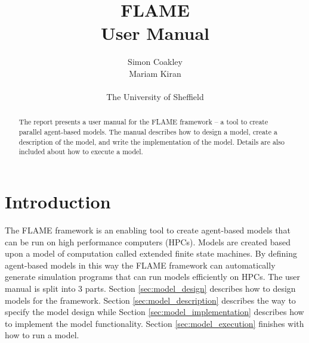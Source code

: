\documentclass[12pt,a4paper]{article}
\begin{document}
\title{FLAME
\\User Manual}
\author{Simon Coakley\\Mariam Kiran
\\
\\ The University of Sheffield}

\maketitle



\begin{abstract}
The report presents a user manual for the FLAME framework -- a tool to create
parallel agent-based models. The manual describes how to design a model, create
a description of the model, and write the implementation of the model. 
Details are also included about how to execute a model.
\end{abstract}


\section{Introduction}

The FLAME framework is an enabling tool to create agent-based models that can
be run on high performance computers (HPCs). Models are created based upon a
model of computation called extended finite state machines. By defining
agent-based models in this way the FLAME framework can
automatically generate simulation programs that can run models efficiently on
HPCs.
The user manual is split into 3 parts. Section \ref{sec:model_design} describes
how to design models for the framework. Section \ref{sec:model_description}
describes the way to specify the model design while Section
\ref{sec:model_implementation} describes how to implement the model
functionality. Section \ref{sec:model_execution} finishes with how to run a
model.










%
%
\end{document}
